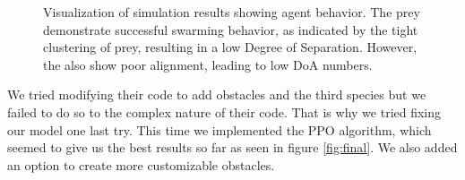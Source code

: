 \documentclass[9pt]{pnas-new}
\begin{document}
\begin{figure}[ht]
\begin{subfigure}{0.30\textwidth}
		\vspace{0.5em}
	\end{subfigure}
	\hfill
	\begin{subfigure}{0.30\textwidth}
		\centering
		\vspace{0.5em}
	\end{subfigure}
	
	\caption{Visualization of simulation results showing agent behavior. The prey demonstrate successful swarming behavior, as indicated by the tight clustering of prey, resulting in a low Degree of Separation. However, the also show poor alignment, leading to low DoA numbers.}
	\label{fig:article}
\end{figure}

We tried modifying their code to add obstacles and the third species but we failed to do so to the complex nature of their code. That is why we tried fixing our model one last try. This time we implemented the PPO algorithm, which seemed to give us the best results so far as seen in figure \ref{fig:final}. We also added an option to create more customizable obstacles. 
\end{document}
